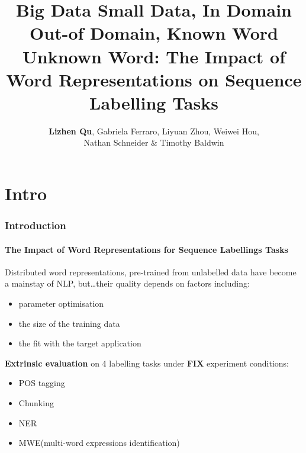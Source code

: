 \documentclass{beamer}
\title[Word Representations on Sequence Labelling Tasks] %
{Big Data Small Data, In Domain Out-of Domain, Known Word Unknown
  Word: The Impact of Word Representations on Sequence Labelling Tasks}
\author[Lizhen Qu et al.]{\textbf{Lizhen Qu}, Gabriela Ferraro, Liyuan Zhou, Weiwei Hou, \\
Nathan Schneider \& Timothy Baldwin }
\newcommand{\task}[1]{\textsf{#1}\xspace}
\newcommand{\pos}{\task{POS tagging}}
\newcommand{\chunking}{\task{Chunking}}
\newcommand{\ner}{\task{NER}}
\newcommand{\mwe}{\task{MWE}}
\begin{document}
{
\begin{frame}
  \titlepage
\end{frame}
}





\section{Intro}
\label{sec:intro}



\begin{frame}
\frametitle{Introduction}
  \framesubtitle{The Impact of Word Representations for Sequence Labellings Tasks}
  
Distributed word representations, pre-trained from unlabelled data 
have become a mainstay of NLP, but\dots their quality depends on factors including: 

\begin{itemize}
\item[\ding{224}] parameter optimisation
\item[\ding{224}] the size of the training data
\item[\ding{224}] the fit with the target application
\end{itemize}  
  
\textbf{Extrinsic evaluation} on 4 labelling tasks under \textbf{FIX} experiment conditions:

\begin{itemize}
\item[\ding{51}] \pos 
\item[\ding{51}] \chunking
\item[\ding{51}] \ner
\item[\ding{51}] \mwe (multi-word expressions identification)
\end{itemize}  



\end{frame}
\end{document}

